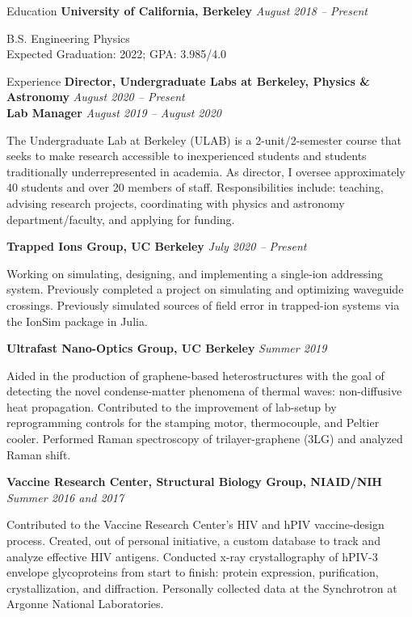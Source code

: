\documentclass{resume}
\newenvironment{indented}{\vspace{-5pt}\begin{list}{}{\setlength{\leftmargin}{0.5cm}}\item[]}{\end{list}}
\begin{document}
	
	\begin{rSection}{Education}
		{\bf University of California, Berkeley} \hfill {\em August 2018 -- Present} 
		\begin{indented}
			B.S. Engineering Physics
			\\Expected Graduation: 2022; GPA: 3.985/4.0
		\end{indented}
	\end{rSection}

	\begin{rSection}{Experience}
		{\bf Director, Undergraduate Labs at Berkeley, Physics \& Astronomy  } \hfill {\em August 2020 -- Present}\\
		{\bf Lab Manager } \hfill {\em August 2019 -- August 2020}
		\begin{indented}
			The Undergraduate Lab at Berkeley (ULAB) is a 2-unit/2-semester course that seeks to make research accessible to inexperienced students and students traditionally underrepresented in academia. As director, I oversee approximately 40 students and over 20 members of staff. Responsibilities include: teaching, advising research projects, coordinating with physics and astronomy department/faculty, and applying for funding.
		\end{indented}
		
		\vspace{-1pt} {\bf Trapped Ions Group, UC Berkeley} \hfill {\em July 2020 -- Present}
		\begin{indented}
			Working on simulating, designing, and implementing a single-ion addressing system. Previously completed a project on simulating and optimizing waveguide crossings. Previously simulated sources of field error in trapped-ion systems via the IonSim package in Julia.
		\end{indented}
		
		
		\vspace{-1pt} {\bf Ultrafast Nano-Optics Group, UC Berkeley} \hfill {\em Summer 2019}
		\begin{indented}
			Aided in the production of graphene-based heterostructures with the goal of detecting the novel condense-matter phenomena of thermal waves: non-diffusive heat propagation. Contributed to the improvement of lab-setup by reprogramming controls for the stamping motor, thermocouple, and Peltier cooler. Performed Raman spectroscopy of trilayer-graphene (3LG) and analyzed Raman shift.
		\end{indented}
	
		\vspace{-1pt} {\bf Vaccine Research Center, Structural Biology Group, NIAID/NIH} \hfill {\em Summer 2016 and 2017}
		\begin{indented}
			Contributed to the Vaccine Research Center's HIV and hPIV vaccine-design process. Created, out of personal initiative, a custom database to track and analyze effective HIV antigens. Conducted x-ray crystallography of hPIV-3 envelope glycoproteins from start to finish: protein expression, purification, crystallization, and diffraction. Personally collected data at the Synchrotron at Argonne National Laboratories.
		\end{indented}
		

\end{rSection}
\end{document}
